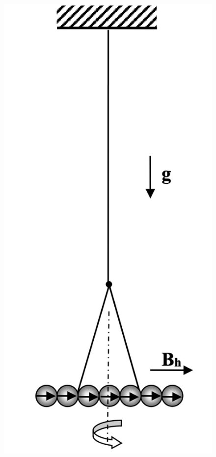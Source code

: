 \documentclass[12pt,a4paper]{article}
\begin{document}
\begin{figure}
    \includegraphics[width=\linewidth]{pics/pic1.png}
\end{figure}  
\end{document}
